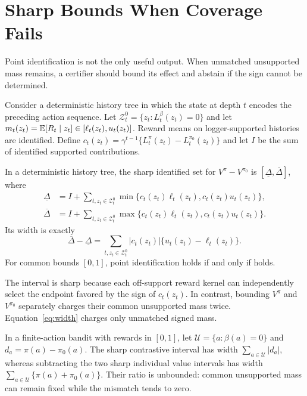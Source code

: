 \section{Sharp Bounds When Coverage Fails}

Point identification is not the only useful output. When unmatched unsupported mass remains, a certifier should bound its effect and abstain if the sign cannot be determined.

Consider a deterministic history tree in which the state at depth $t$ encodes the preceding action sequence. Let $\mathcal Z_t^0=\{z_t:L_t^\beta(z_t)=0\}$ and let $m_t(z_t)=\mathbb{E}[R_t\mid z_t]\in[\ell_t(z_t),u_t(z_t)]$. Reward means on logger-supported histories are identified. Define
$c_t(z_t)=\gamma^{t-1}\{L_t^\pi(z_t)-L_t^{\pi_0}(z_t)\}$ and let $I$ be the sum of identified supported contributions.

\begin{theorem}
\label{thm:sharp}
In a deterministic history tree, the sharp identified set for $V^\pi-V^{\pi_0}$ is $[\underline\Delta,\overline\Delta]$, where
\begin{align}
\underline\Delta &= I+\sum_{t,z_t\in\mathcal Z_t^0}
\min\{c_t(z_t)\ell_t(z_t),c_t(z_t)u_t(z_t)\},\\
\overline\Delta &= I+\sum_{t,z_t\in\mathcal Z_t^0}
\max\{c_t(z_t)\ell_t(z_t),c_t(z_t)u_t(z_t)\}.
\end{align}
Its width is exactly
\begin{equation}
\overline\Delta-\underline\Delta
=\sum_{t,z_t\in\mathcal Z_t^0}
|c_t(z_t)|\{u_t(z_t)-\ell_t(z_t)\}.
\label{eq:width}
\end{equation}
For common bounds $[0,1]$, point identification holds if and only if \UCC holds.
\end{theorem}

The interval is sharp because each off-support reward kernel can independently select the endpoint favored by the sign of $c_t(z_t)$. In contrast, bounding $V^\pi$ and $V^{\pi_0}$ separately charges their common unsupported mass twice. Equation~\eqref{eq:width} charges only unmatched signed mass.

\begin{corollary}
\label{cor:banditwidth}
In a finite-action bandit with rewards in $[0,1]$, let
$\mathcal U=\{a:\beta(a)=0\}$ and $d_a=\pi(a)-\pi_0(a)$.
The sharp contrastive interval has width
$\sum_{a\in\mathcal U}|d_a|$, whereas subtracting the two sharp individual value intervals has width
$\sum_{a\in\mathcal U}\{\pi(a)+\pi_0(a)\}$.
Their ratio is unbounded: common unsupported mass can remain fixed while the mismatch tends to zero.
\end{corollary}

